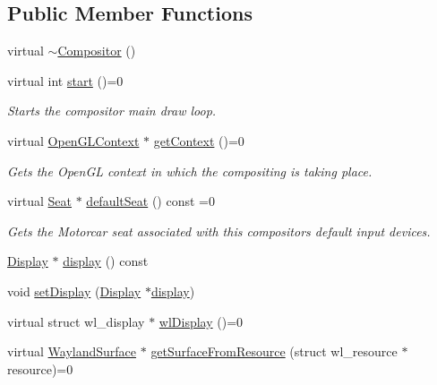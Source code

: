 \subsection*{Public Member Functions}
\begin{DoxyCompactItemize}
\item 
virtual \hyperlink{classmotorcar_1_1Compositor_ab9963bdfdd7deafdaec1a5ebf8f2d97b}{$\sim$\-Compositor} ()
\item 
virtual int \hyperlink{classmotorcar_1_1Compositor_a9d4b703e99386360996087a1100fae52}{start} ()=0
\begin{DoxyCompactList}\small\item\em Starts the compositor main draw loop. \end{DoxyCompactList}\item 
virtual \hyperlink{classmotorcar_1_1OpenGLContext}{Open\-G\-L\-Context} $\ast$ \hyperlink{classmotorcar_1_1Compositor_afb0a16529f65b5e2ecf8f15524680c57}{get\-Context} ()=0
\begin{DoxyCompactList}\small\item\em Gets the Open\-G\-L context in which the compositing is taking place. \end{DoxyCompactList}\item 
virtual \hyperlink{classmotorcar_1_1Seat}{Seat} $\ast$ \hyperlink{classmotorcar_1_1Compositor_a45eb7c046129335455ed4d438707a0a3}{default\-Seat} () const =0
\begin{DoxyCompactList}\small\item\em Gets the Motorcar seat associated with this compositors default input devices. \end{DoxyCompactList}\item 
\hyperlink{classmotorcar_1_1Display}{Display} $\ast$ \hyperlink{classmotorcar_1_1Compositor_a101830d8941b3d51a57e224950240cfe}{display} () const 
\item 
void \hyperlink{classmotorcar_1_1Compositor_a432fe3ad3e6ff3e22c61b3dc98f719f6}{set\-Display} (\hyperlink{classmotorcar_1_1Display}{Display} $\ast$\hyperlink{structdisplay}{display})
\item 
virtual struct wl\-\_\-display $\ast$ \hyperlink{classmotorcar_1_1Compositor_a19115510ba397b13d439eac5323ea998}{wl\-Display} ()=0
\item 
virtual \hyperlink{classmotorcar_1_1WaylandSurface}{Wayland\-Surface} $\ast$ \hyperlink{classmotorcar_1_1Compositor_abc7e49b58794334e99a0433389a39929}{get\-Surface\-From\-Resource} (struct wl\-\_\-resource $\ast$resource)=0
\end{DoxyCompactItemize}
